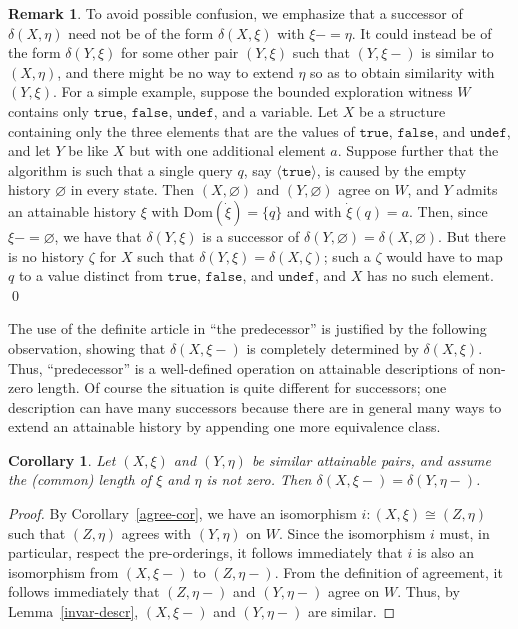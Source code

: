 \documentclass{LMCS}
\newtheorem{coro}[thm]{Corollary}
\theoremstyle{definition}
\newtheorem{rmk}[thm]{Remark}
\newcommand{\ans}{\dot}
\newcommand{\dom}[1]{\ensuremath{{\text{Dom}}(#1)}}
\newcommand{\emp}{\varnothing}
\newcommand{\sq}[1]{\ensuremath{\langle#1\rangle}}
\newcommand{\ttt}[1]{\ensuremath{\mathtt {#1}}}
\begin{document}
\begin{rmk}
To avoid possible confusion, we emphasize that a successor of
$\delta(X,\eta)$ need not be of the form $\delta(X,\xi)$ with
$\xi-=\eta$.  It could instead be of the form $\delta(Y,\xi)$ for some
other pair $(Y,\xi)$ such that $(Y,\xi-)$ is similar to $(X,\eta)$,
and there might be no way to extend $\eta$ so as to obtain similarity
with $(Y,\xi)$.  For a simple example, suppose the bounded exploration
witness $W$ contains only \ttt{true}, \ttt{false}, \ttt{undef}, and a
variable.  Let $X$ be a structure containing only the three elements
that are the values of \ttt{true}, \ttt{false}, and \ttt{undef}, and
let $Y$ be like $X$ but with one additional element $a$.  Suppose
further that the algorithm is such that a single query $q$, say
\sq{\ttt{true}}, is caused by the empty history $\emp$ in every state.
Then $(X,\emp)$ and $(Y,\emp)$ agree on $W$, and $Y$ admits an
attainable history $\xi$ with $\dom{\ans\xi}=\{q\}$ and with
$\ans\xi(q)=a$.  Then, since $\xi-=\emp$, we have that $\delta(Y,\xi)$
is a successor of $\delta(Y,\emp)=\delta(X,\emp)$.  But there is no
history $\zeta$ for $X$ such that $\delta(Y,\xi)=\delta(X,\zeta)$; such
a $\zeta$ would have to map $q$ to a value distinct from \ttt{true},
\ttt{false}, and \ttt{undef}, and $X$ has no such element.
\qed\end{rmk}

The use of the definite article in ``the predecessor'' is justified by
the following observation, showing that $\delta(X,\xi-)$ is completely
determined by $\delta(X,\xi)$.  Thus, ``predecessor'' is a
well-defined operation on attainable descriptions of non-zero length.
Of course the situation is quite different for successors; one
description can have many successors because there are in general many
ways to extend an attainable history by appending one more equivalence
class.

\begin{coro}
  Let $(X,\xi)$ and $(Y,\eta)$ be similar attainable pairs,
  and assume the (common) length of $\xi$ and $\eta$ is
  not zero.  Then $\delta(X,\xi-)=\delta(Y,\eta-)$.
\end{coro}

\begin{proof}
By Corollary~\ref{agree-cor}, we have an isomorphism
$i:(X,\xi)\cong(Z,\eta)$ such that $(Z,\eta)$ agrees with $(Y,\eta)$
on $W$.  Since the isomorphism $i$ must, in particular, respect the
pre-orderings, it follows immediately that $i$ is also an isomorphism
from $(X,\xi-)$ to $(Z,\eta-)$.  From the definition of agreement, it
follows immediately that $(Z,\eta-)$ and $(Y,\eta-)$ agree on $W$.
Thus, by Lemma~\ref{invar-descr}, $(X,\xi-)$ and $(Y,\eta-)$ are
similar.
\end{proof}
\end{document}
